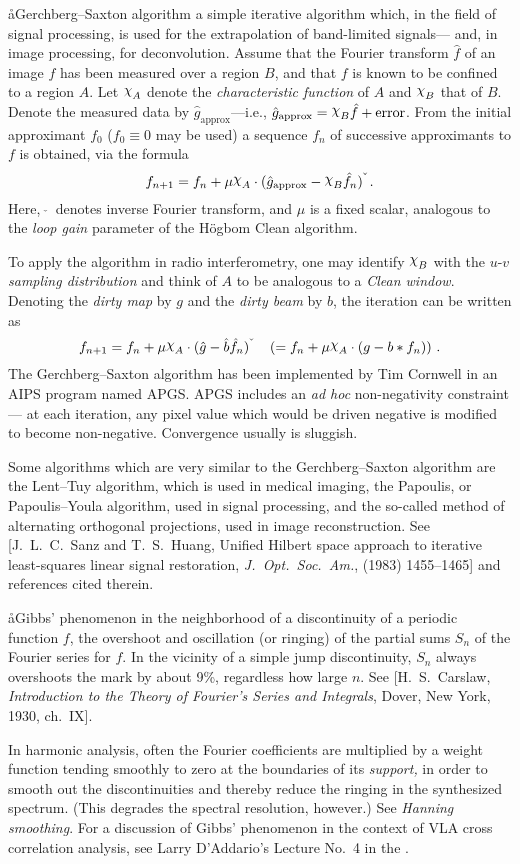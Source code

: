 \aa{Gerchberg--Saxton algorithm}
a simple iterative algorithm which, in the field of signal
processing, is used for the extrapolation of band-limited signals---%
and, in image processing, for deconvolution.
Assume that the Fourier transform $\hat f$ of an image $f$
has been measured over a region $B$, and that $f$ is known
to be confined to a region $A$.
Let $\charfn A$ denote the {\it characteristic function} of $A$
and $\charfn B$ that of $B$.
\def\ghap{\hat g_{\operatorname{approx}}}
Denote the measured data by $\ghap$---i.e.,
$\ghap=\charfn B\hat f+\operatorname{error}$.
From the initial approximant $f_0$
($f_0\equiv0$ may be used)
a sequence $f_n$ of successive approximants to $f$
is obtained, via the formula
$$f_{n+1}=f_n+\mu\charfn A\cdot(\ghap-\charfn B\hat f_n)\formcheck\,.$$
Here, $\ \check{}\ $ denotes inverse Fourier transform,
and $\mu$ is a fixed scalar, analogous to the {\it loop gain}
parameter of the H\"ogbom Clean algorithm.
\par
To apply the algorithm in radio interferometry, one may
identify $\charfn B$ with the $u$-$v$ {\it sampling distribution}
and think of $A$ to be analogous to a {\it Clean window}.
Denoting the {\it dirty map} by $g$ and the {\it dirty beam}
by $b$,
the iteration can be written as
$$f_{n+1}=f_n+\mu\charfn A\cdot(\hat g-\hat b\hat f_n)\formcheck
\quad\left(=f_n+\mu\charfn A\cdot(g-b\ast f_n)\right)\,.$$
The Gerchberg--Saxton algorithm has been implemented
by Tim Cornwell in an AIPS program named APGS.
APGS includes an {\it ad hoc} non-negativity constraint---%
at each iteration,
any pixel value which would be driven negative
is modified to become non-negative.
Convergence usually is sluggish.
\par
Some algorithms which are very similar to the Gerchberg--Saxton algorithm
are the Lent--Tuy algorithm, which is used in medical imaging,
the Papoulis, or Papoulis--Youla algorithm, used in signal processing,
and the so-called method of alternating orthogonal projections,
used in image reconstruction.
See [J.~L.~C.~Sanz and T.~S.~Huang,
Unified Hilbert space approach to iterative least-squares linear
signal restoration, {\it J.~Opt.\ Soc.~Am.},  (1983) 1455--1465]
and references cited therein.

\aa{Gibbs' phenomenon}
in the neighborhood of a discontinuity of a periodic function $f$,
the overshoot and oscillation (or ringing)
of the partial sums $S_n$ of the Fourier series for $f$.
In the vicinity of a simple jump discontinuity,
$S_n$ always overshoots the mark by about 9\%, regardless how large $n$.
See [H.~S.~Carslaw, {\it Introduction to the Theory of Fourier's
Series and Integrals}, Dover, New York, 1930, ch.~IX].
\par
In harmonic analysis,
often the Fourier coefficients are multiplied by a weight function
tending smoothly to zero at the boundaries of its {\it support,}
in order to smooth out the discontinuities
and thereby reduce the ringing in the synthesized spectrum.
(This degrades the spectral resolution, however.)
See {\it Hanning smoothing}.
For a discussion of Gibbs' phenomenon in the context
of VLA cross correlation analysis, see Larry D'Addario's
Lecture No.~4 in the \sira.

